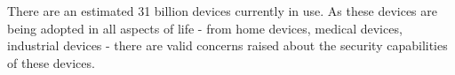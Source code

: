 There are an estimated 31 billion devices currently in use. As these devices are
being adopted in all aspects of life - from home devices, medical devices,
industrial devices - there are valid concerns raised about the security
capabilities of these devices.
